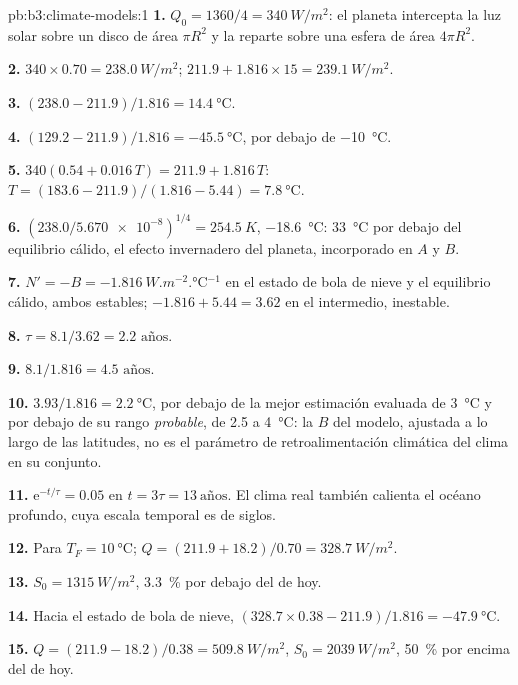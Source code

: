 \begin{solution}{pb:b3:climate-models:1}
\textbf{1.} $Q_0 = 1360/4 = \qty{340}{W/m^2}$: el planeta intercepta la
luz solar sobre un disco de área $\pi R^2$ y la reparte sobre una esfera de área
$4\pi R^2$.

\textbf{2.} $340\times0.70 = \qty{238.0}{W/m^2}$; $211.9 + 1.816\times15 =
\qty{239.1}{W/m^2}$.

\textbf{3.} $(238.0 - 211.9)/1.816 = \qty{14.4}{\celsius}$.

\textbf{4.} $(129.2 - 211.9)/1.816 = \qty{-45.5}{\celsius}$, por debajo de
\qty{-10}{\celsius}.

\textbf{5.} $340(0.54 + 0.016\,T) = 211.9 + 1.816\,T$: $T =
(183.6 - 211.9)/(1.816 - 5.44) = \qty{7.8}{\celsius}$.

\textbf{6.} $(238.0/\num{5.670e-8})^{1/4} = \qty{254.5}{K}$,
\qty{-18.6}{\celsius}: \qty{33}{\celsius} por debajo del equilibrio cálido, el
efecto invernadero del planeta, incorporado en $A$ y $B$.

\textbf{7.} $N' = -B = \qty{-1.816}{W.m^{-2}.\celsius^{-1}}$ en el
estado de bola de nieve y el equilibrio cálido, ambos estables; $-1.816 + 5.44 =
\num{+3.62}$ en el intermedio, inestable.

\textbf{8.} $\tau = 8.1/3.62 = \num{2.2}\text{ años}$.

\textbf{9.} $8.1/1.816 = \num{4.5}\text{ años}$.

\textbf{10.} $3.93/1.816 = \qty{2.2}{\celsius}$, por debajo de la mejor
estimación evaluada de \qty{3}{\celsius} y por debajo de su rango \emph{probable}, de 2.5 a
\qty{4}{\celsius}: la $B$ del modelo, ajustada a lo largo de las latitudes, no es
el parámetro de retroalimentación climática del clima en su conjunto.

\textbf{11.} $\mathrm e^{-t/\tau} = 0.05$ en $t = 3\tau =
\num{13}~\text{años}$. El clima real también calienta el océano profundo, cuya escala temporal
es de siglos.

\textbf{12.} Para $T_F = \qty{10}{\celsius}$; $Q = (211.9 + 18.2)/0.70 =
\qty{328.7}{W/m^2}$.

\textbf{13.} $S_0 = \qty{1315}{W/m^2}$, \qty{3.3}{\percent} por debajo del de hoy.

\textbf{14.} Hacia el estado de bola de nieve, $(328.7\times0.38 - 211.9)/1.816 =
\qty{-47.9}{\celsius}$.

\textbf{15.} $Q = (211.9 - 18.2)/0.38 = \qty{509.8}{W/m^2}$, $S_0 =
\qty{2039}{W/m^2}$, \qty{50}{\percent} por encima del de hoy.


\end{solution}
